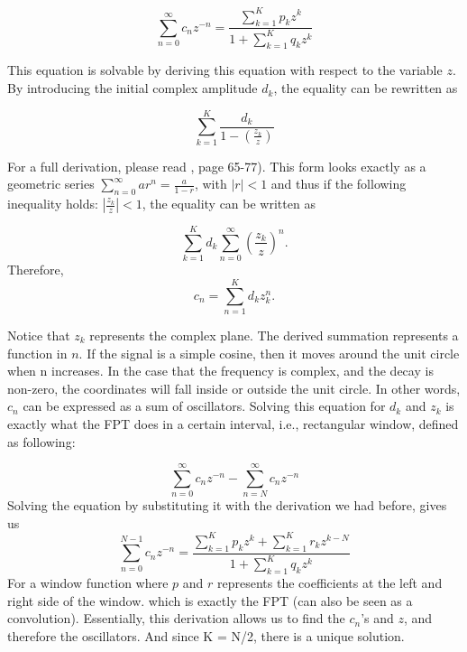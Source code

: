 \begin{equation}
	\sum^\infty_{n=0} c_n z^{-n} = \frac{\sum\limits^K_{k=1} p_k z^k}{1+\sum\limits^K_{k=1}q_kz^k}
\end{equation}

This equation is solvable by deriving this equation with respect to the variable $z$. By introducing the initial complex amplitude $d_k$, the equality can be rewritten as

\begin{equation}
    \sum^K_{k=1} \frac{d_k}{1-(\frac{z_k}{z})}
\end{equation}


For a full derivation, please read \textcite{belkic_signal_2019}, page 65-77). This form looks exactly as a geometric series $\sum^\infty_{n=0}ar^n=\frac{a}{1-r}$, with $|r| < 1$ and thus if the following inequality holds: $|\frac{z_k}{z}|<1$, the equality can be written as

\begin{equation}
 \sum^K_{k=1} d_k \sum^\infty_{n=0}(\frac{z_k}{z})^n.
\end{equation}
Therefore,
\begin{equation}
    c_n = \sum^K_{n=1} d_k z_k^n.
\end{equation}

Notice that $z_k$ represents the complex plane. The derived summation represents a function in $n$. If the signal is a simple cosine, then it moves around the unit circle when n increases. In the case that the frequency is complex, and the decay is non-zero, the coordinates will fall inside or outside the unit circle. In other words, $c_n$ can be expressed as a sum of oscillators. Solving this equation for $d_k$ and $z_k$ is exactly what the FPT does in a certain interval, i.e., rectangular window, defined as following:

\begin{equation}
    \sum^\infty_{n=0} c_n z^{-n} - \sum^\infty_{n=N} c_n z^{-n}
\end{equation}
Solving the equation by substituting it with the derivation we had before, gives us
\begin{equation}
    \sum^{N-1}_{n=0} c_n z^{-n} = \frac{\sum\limits_{k=1}^K p_k z^{k}+\sum\limits_{k=1}^K r_k z^{k-N}}{1+\sum\limits_{k=1}^K q_kz^k}
\end{equation}
For a window function where $p$ and $r$ represents the coefficients at the left and right side of the window. which is exactly the FPT (can also be seen as a convolution). Essentially, this derivation allows us to find the $c_n$'s and $z$, and therefore the oscillators. And since K = N/2, there is a unique solution.

